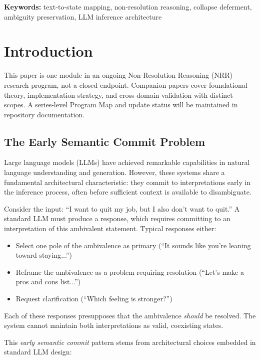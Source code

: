\documentclass[11pt,a4paper]{article}
\begin{document}
\noindent\textbf{Keywords:} text-to-state mapping, non-resolution reasoning, collapse deferment, 
ambiguity preservation, LLM inference architecture

\section{Introduction}
\label{sec:intro}

This paper is one module in an ongoing Non-Resolution Reasoning (NRR) research program, not a closed endpoint. Companion papers cover foundational theory, implementation strategy, and cross-domain validation with distinct scopes. A series-level Program Map and update status will be maintained in repository documentation.

\subsection{The Early Semantic Commit Problem}

Large language models (LLMs) have achieved remarkable capabilities in natural language 
understanding and generation. However, these systems share a fundamental architectural 
characteristic: they commit to interpretations early in the inference process, often 
before sufficient context is available to disambiguate.

Consider the input: ``I want to quit my job, but I also don't want to quit.'' 
A standard LLM must produce a response, which requires committing to an interpretation 
of this ambivalent statement. Typical responses either:
\begin{itemize}
    \item Select one pole of the ambivalence as primary (``It sounds like you're leaning toward staying...'')
    \item Reframe the ambivalence as a problem requiring resolution (``Let's make a pros and cons list...'')
    \item Request clarification (``Which feeling is stronger?'')
\end{itemize}

Each of these responses presupposes that the ambivalence \textit{should} be resolved. 
The system cannot maintain both interpretations as valid, coexisting states.

This \textit{early semantic commit} pattern stems from architectural choices embedded 
in standard LLM design:
\end{document}
